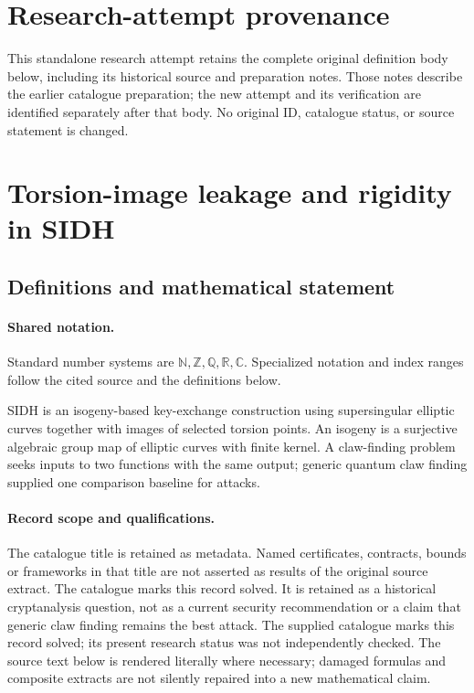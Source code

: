 \documentclass[11pt]{article}
\begin{document}
\section*{Research-attempt provenance}
This standalone research attempt retains the complete original definition body below,
including its historical source and preparation notes. Those notes describe the
earlier catalogue preparation; the new attempt and its verification are identified
separately after that body. No original ID, catalogue status, or source statement is changed.

\section{Torsion-image leakage and rigidity in SIDH}\label{statement}

\subsection{Definitions and mathematical statement}

\paragraph{Shared notation.}Standard number systems are $\mathbb N,\mathbb Z,\mathbb Q,\mathbb R,\mathbb C$. Specialized notation and index ranges follow the cited source and the definitions below.


SIDH is an isogeny-based key-exchange construction using supersingular elliptic curves together with images of selected torsion points. An isogeny is a surjective algebraic group map of elliptic curves with finite kernel. A claw-finding problem seeks inputs to two functions with the same output; generic quantum claw finding supplied one comparison baseline for attacks.
\paragraph{Record scope and qualifications.}
The catalogue title is retained as metadata. Named certificates, contracts, bounds or frameworks in that title are not asserted as results of the original source extract.
The catalogue marks this record solved. It is retained as a historical cryptanalysis question, not as a current security recommendation or a claim that generic claw finding remains the best attack. The supplied catalogue marks this record solved; its present research status was not independently checked.
The source text below is rendered literally where necessary; damaged formulas and composite extracts are not silently repaired into a new mathematical claim.
\end{document}
